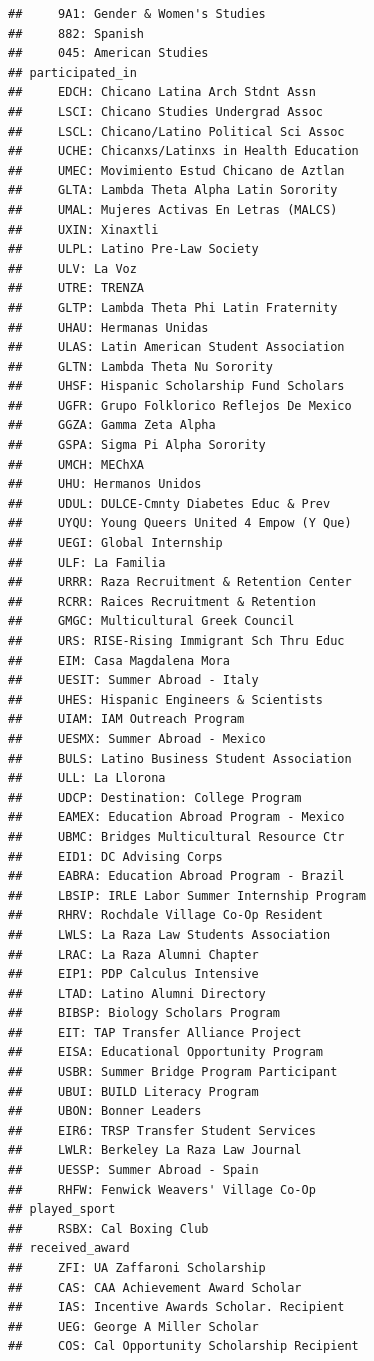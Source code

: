 \documentclass[]{book}
\begin{document}
\begin{verbatim}
##     9A1: Gender & Women's Studies
##     882: Spanish
##     045: American Studies
## participated_in 
##     EDCH: Chicano Latina Arch Stdnt Assn
##     LSCI: Chicano Studies Undergrad Assoc
##     LSCL: Chicano/Latino Political Sci Assoc
##     UCHE: Chicanxs/Latinxs in Health Education
##     UMEC: Movimiento Estud Chicano de Aztlan
##     GLTA: Lambda Theta Alpha Latin Sorority
##     UMAL: Mujeres Activas En Letras (MALCS)
##     UXIN: Xinaxtli
##     ULPL: Latino Pre-Law Society
##     ULV: La Voz
##     UTRE: TRENZA
##     GLTP: Lambda Theta Phi Latin Fraternity
##     UHAU: Hermanas Unidas
##     ULAS: Latin American Student Association
##     GLTN: Lambda Theta Nu Sorority
##     UHSF: Hispanic Scholarship Fund Scholars
##     UGFR: Grupo Folklorico Reflejos De Mexico
##     GGZA: Gamma Zeta Alpha
##     GSPA: Sigma Pi Alpha Sorority
##     UMCH: MEChXA
##     UHU: Hermanos Unidos
##     UDUL: DULCE-Cmnty Diabetes Educ & Prev
##     UYQU: Young Queers United 4 Empow (Y Que)
##     UEGI: Global Internship
##     ULF: La Familia
##     URRR: Raza Recruitment & Retention Center
##     RCRR: Raices Recruitment & Retention
##     GMGC: Multicultural Greek Council
##     URS: RISE-Rising Immigrant Sch Thru Educ
##     EIM: Casa Magdalena Mora
##     UESIT: Summer Abroad - Italy
##     UHES: Hispanic Engineers & Scientists
##     UIAM: IAM Outreach Program
##     UESMX: Summer Abroad - Mexico
##     BULS: Latino Business Student Association
##     ULL: La Llorona
##     UDCP: Destination: College Program
##     EAMEX: Education Abroad Program - Mexico
##     UBMC: Bridges Multicultural Resource Ctr
##     EID1: DC Advising Corps
##     EABRA: Education Abroad Program - Brazil
##     LBSIP: IRLE Labor Summer Internship Program
##     RHRV: Rochdale Village Co-Op Resident
##     LWLS: La Raza Law Students Association
##     LRAC: La Raza Alumni Chapter
##     EIP1: PDP Calculus Intensive
##     LTAD: Latino Alumni Directory
##     BIBSP: Biology Scholars Program
##     EIT: TAP Transfer Alliance Project
##     EISA: Educational Opportunity Program
##     USBR: Summer Bridge Program Participant
##     UBUI: BUILD Literacy Program
##     UBON: Bonner Leaders
##     EIR6: TRSP Transfer Student Services
##     LWLR: Berkeley La Raza Law Journal
##     UESSP: Summer Abroad - Spain
##     RHFW: Fenwick Weavers' Village Co-Op
## played_sport 
##     RSBX: Cal Boxing Club
## received_award 
##     ZFI: UA Zaffaroni Scholarship
##     CAS: CAA Achievement Award Scholar
##     IAS: Incentive Awards Scholar. Recipient
##     UEG: George A Miller Scholar
##     COS: Cal Opportunity Scholarship Recipient
\end{verbatim}
\end{document}
